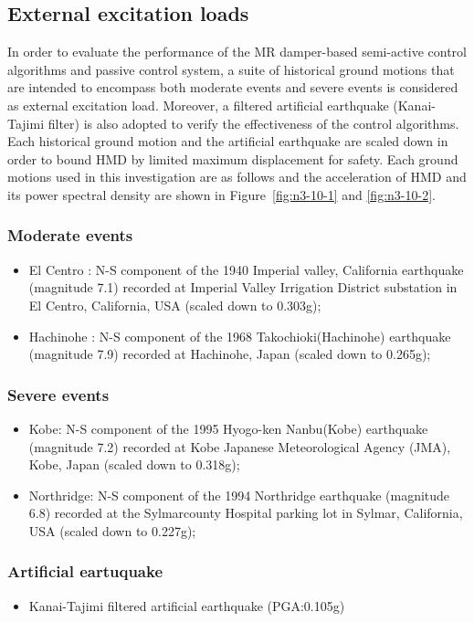 \subsection{External excitation loads}
In order to evaluate the performance of the MR damper-based semi-active control algorithms and passive control system, a suite of historical ground motions that are intended to encompass both moderate events and severe events is considered as external excitation load. Moreover, a filtered artificial earthquake (Kanai-Tajimi filter) is also adopted to verify the effectiveness of the control algorithms. Each historical ground motion and the artificial earthquake are scaled down in order to bound HMD by limited maximum displacement for safety. Each ground motions used in this investigation are as follows and the acceleration of HMD and its power spectral density are shown in Figure~\ref{fig:n3-10-1} and \ref{fig:n3-10-2}.

\subsubsection{Moderate events}
\begin{itemize}
\item El Centro : N-S component of the 1940 Imperial valley, California earthquake (magnitude 7.1) recorded at Imperial Valley Irrigation District substation in El Centro, California, USA (scaled down to 0.303g);
\item Hachinohe : N-S component of the 1968 Takochioki(Hachinohe) earthquake (magnitude 7.9) recorded at Hachinohe, Japan (scaled down to 0.265g);
\end{itemize}

\subsubsection{Severe events}
\begin{itemize}
   \item Kobe: N-S component of the 1995 Hyogo-ken Nanbu(Kobe) earthquake (magnitude 7.2) recorded at Kobe Japanese Meteorological Agency (JMA), Kobe, Japan (scaled down to 0.318g);

   \item  Northridge: N-S component of the 1994 Northridge earthquake (magnitude 6.8) recorded at the Sylmarcounty Hospital parking lot in Sylmar, California, USA (scaled down to 0.227g);
\end{itemize}

\subsubsection{Artificial eartuquake}
\begin{itemize}
   \item  Kanai-Tajimi filtered artificial earthquake (PGA:0.105g)
\end{itemize}


